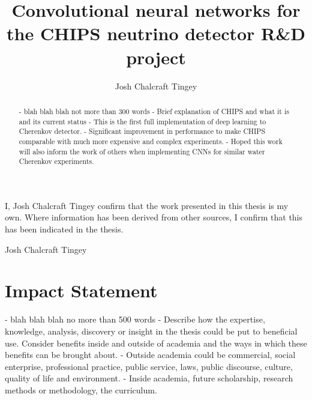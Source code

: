 
\title{Convolutional neural networks for the CHIPS neutrino detector R\&D project}
\author{Josh Chalcraft Tingey}

\thispagestyle{plain}

\begin{declaration} %
    I, Josh Chalcraft Tingey confirm that the work presented in this thesis is my own. Where
    information has been derived from other sources, I confirm that this has been indicated in the
    thesis.
    \vspace*{1cm}
    \begin{flushright}
        Josh Chalcraft Tingey
    \end{flushright}
\end{declaration}

\begin{abstract} %
    - blah blah blah not more than 300 words
    - Brief explanation of CHIPS and what it is and its current status
    - This is the first full implementation of deep learning to Cherenkov detector.
    - Significant improvement in performance to make CHIPS comparable with much more expensive and
    complex experiments.
    - Hoped this work will also inform the work of others when implementing CNNs for similar water
    Cherenkov experiments.
\end{abstract}

\chapter*{\centering Impact Statement} %
- blah blah blah no more than 500 words
- Describe how the expertise, knowledge, analysis, discovery or insight in the thesis could be put
to beneficial use. Consider benefits inside and outside of academia and the ways in which these
benefits can be brought about.
- Outside academia could be commercial, social enterprise, professional practice, public service,
laws, public discourse, culture, quality of life and environment.
- Inside academia, future scholarship, research methods or methodology, the curriculum.

